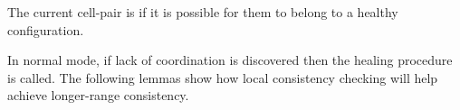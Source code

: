 \documentclass[11pt]{memoir}
\theoremstyle{definition} %
\newcommand{\fld}[1]{\ensuremath{\textit{#1\/}}}
\newcommand{\pos}{\mathrm{pos}}
\newcommand{\TransferSw}{\mathrm{TransferSw}}
\newcommand{\Last}{\mathrm{Last}}
\newcommand{\Sweep}{\fld{Sweep}} %
\begin{document}


        
        





\begin{definition}[Coordination] \label{def:coordinated}
   The current cell-pair is  
   if it is possible for them to belong to a healthy configuration.
\end{definition}

In normal mode, if lack of coordination is discovered then the healing procedure is called.
The following lemmas show 
how local consistency checking will help achieve longer-range consistency.
\end{document}
